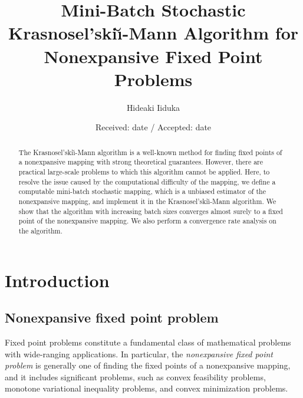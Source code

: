 \documentclass[smallextended,referee,envcountsect,]{svjour3}
\begin{document}
\allowdisplaybreaks


\newcommand{\argmax}{\operatornamewithlimits{argmax}}
\newcommand{\argmin}{\operatornamewithlimits{argmin}}


\title{Mini-Batch Stochastic Krasnosel'ski\u\i-Mann Algorithm for Nonexpansive Fixed Point Problems}

\author{Hideaki Iiduka}


\date{Received: date / Accepted: date}

\maketitle

\begin{abstract}
The Krasnosel'ski\u\i-Mann algorithm is a well-known method for finding fixed points of a nonexpansive mapping with strong theoretical guarantees. However, there are practical large-scale problems to which this algorithm cannot be applied. Here, to resolve the issue caused by the computational difficulty of the mapping, we define a computable mini-batch stochastic mapping, which is a unbiased estimator of the nonexpansive mapping, and implement it in the Krasnosel'ski\u\i-Mann algorithm. We show that the algorithm with increasing batch sizes converges almost surely to a fixed point of the nonexpansive mapping. We also perform a convergence rate analysis on the algorithm.
\end{abstract}


\section{Introduction}
\subsection{Nonexpansive fixed point problem}
Fixed point problems \cite{goebel1,goebel2,b-c,takahashi} constitute a fundamental class of mathematical problems with wide-ranging applications. In particular, the {\em nonexpansive fixed point problem} is generally one of finding the fixed points of a nonexpansive mapping, and it includes significant problems, such as convex feasibility problems, monotone variational inequality problems, and convex minimization problems.
\end{document}
